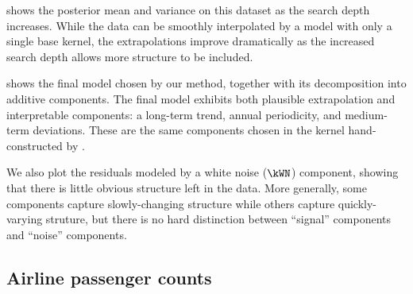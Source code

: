  shows the posterior mean and variance on this dataset as the search depth increases.
While the data can be smoothly interpolated by a model with only a single base kernel, the extrapolations improve dramatically as the increased search depth allows more structure to be included.

 shows the final model chosen by our method, together with its decomposition into additive components.
The final model exhibits both plausible extrapolation and interpretable components: a long-term trend, annual periodicity, and medium-term deviations.
These are the same components chosen in the kernel hand-constructed by \citet[Chapter 5]{rasmussen38gaussian}.

We also plot the residuals modeled by a white noise ($\kWN$) component, showing that there is little obvious structure left in the data.
More generally, some components capture slowly-changing structure while others capture quickly-varying struture, but there is no hard distinction between ``signal'' components and ``noise'' components.





\subsection{Airline passenger counts}

